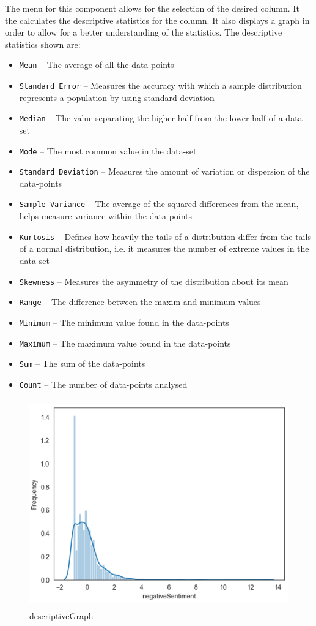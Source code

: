The menu for this component allows for the selection of the desired column. It the calculates the descriptive statistics for the column. It also displays a graph in order to allow for a better understanding of the statistics. The descriptive statistics shown are:
\begin{itemize}
    \item \texttt{Mean} -- The average of all the data-points
    \item \texttt{Standard Error} -- Measures the accuracy with which a sample distribution represents a population by using standard deviation
    \item \texttt{Median} -- The value separating the higher half from the lower half of a data-set
    \item \texttt{Mode} -- The most common value in the data-set
    \item \texttt{Standard Deviation} -- Measures the amount of variation or dispersion of the data-points
    \item \texttt{Sample Variance} -- The average of the squared differences from the mean, helps measure variance within the data-points
    \item \texttt{Kurtosis} -- Defines how heavily the tails of a distribution differ from the tails of a normal distribution, i.e. it measures the number of extreme values in the data-set
    \item \texttt{Skewness} -- Measures the asymmetry of the distribution about its mean
    \item \texttt{Range} -- The difference between the maxim and minimum values
    \item \texttt{Minimum} -- The minimum value found in the data-points
    \item \texttt{Maximum} -- The maximum value found in the data-points
    \item \texttt{Sum} -- The sum of the data-points
    \item \texttt{Count} -- The number of data-points analysed
\end{itemize}

\begin{figure}[h!]
    \centering
    \includegraphics[width=15cm,height=9cm,keepaspectratio]{implementation/descriptiveGraph.png}
    \caption{descriptiveGraph}
    \label{fig:descriptiveGraph}
\end{figure}


